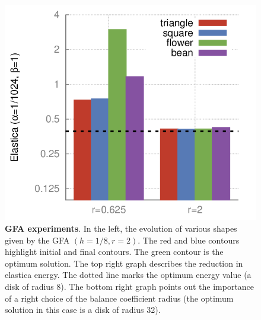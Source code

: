 \documentclass[review]{siamart220329}
\begin{document}
\begin{figure}
\begin{minipage}{0.75\textwidth}
\includegraphics[scale=0.22]{figures/shape-flow/plots/bars.png}
\end{minipage}
\caption{\textbf{GFA experiments}. In the left, the evolution of various shapes given by the GFA $(h=1/8,r=2)$. The red and blue contours highlight initial and final contours. The green contour is the optimum solution. The top right graph describes the reduction in elastica energy. The dotted line marks the optimum energy value (a disk of radius $8$). The bottom right graph points out the importance of a right choice of the balance coefficient radius (the optimum solution in this case is a disk of radius 32).}
\label{fig:graph-flow-experiments}
\end{figure}
\end{document}
